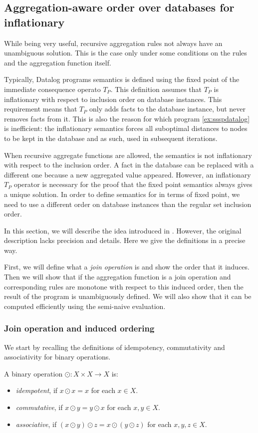 \subsection{Aggregation-aware order over databases for inflationary \datalogra}
While being very useful, recursive aggregation rules not always have an unambiguous solution. This is the case only under some conditions on the rules and the aggregation function itself.

Typically, Datalog programs semantics is defined using the fixed point of the immediate consequence operato $T_P$. This definition assumes that $T_P$ is inflationary with respect to inclusion order on database instances. This requirement means that $T_P$ only adds facts to the database instance, but never removes facts from it. This is also the reason for which program \ref{ex:ssspdatalog} is inefficient: the inflationary semantics forces all suboptimal distances to nodes to be kept in the database and as such, used in subsequent iterations.

When recursive aggregate functions are allowed, the semantics is not inflationary with respect to the inclusion order. A fact in the database can be replaced with a different one because a new aggregated value appeared. However, an inflationary $T_P$ operator is necessary for the proof that the fixed point semantics always gives a unique solution. In order to define semantics for \datalogra in terms of fixed point, we need to use a different order on database instances than the regular set inclusion order.

In this section, we will describe the idea introduced in \cite{socialite}. However, the original description lacks precision and details. Here we give the definitions in a precise way.

First, we will define what a \emph{join operation} is and show the order that it induces. Then we will show that if the aggregation function is a join operation and corresponding rules are monotone with respect to this induced order, then the result of the program is unambiguously defined. We will also show that it can be computed efficiently using the semi-naive evaluation.

\subsubsection{Join operation and induced ordering}
We start by recalling the definitions of idempotency, commutativity and associativity for binary operations.
\begin{defn}
A binary operation $\odot: X \times X \to X$ is:
\begin{itemize}
\item \emph{idempotent}, if $x \odot x = x$ for each $x \in X$.
\item \emph{commutative}, if $x \odot y = y \odot x$ for each $x, y \in X$.
\item \emph{associative}, if $(x \odot y) \odot z = x \odot (y \odot z)$ for each $x, y, z \in X$.
\end{itemize}
\end{defn}

